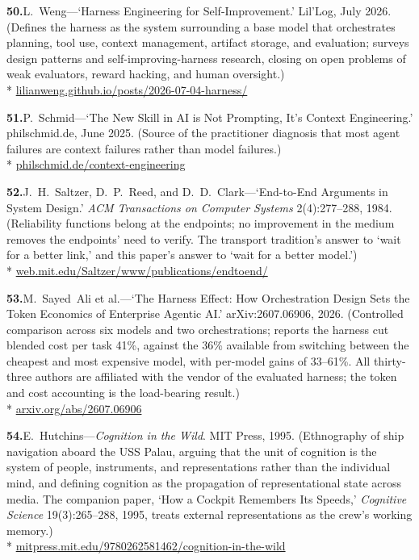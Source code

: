 \documentclass[11pt, a4paper]{article}
\begin{document}
\noindent\textbf{50.}\enspace L.~Weng---`Harness Engineering for Self-Improvement.'
Lil'Log, July 2026. (Defines the harness as the system surrounding a base model that
orchestrates planning, tool use, context management, artifact storage, and evaluation;
surveys design patterns and self-improving-harness research, closing on open problems of
weak evaluators, reward hacking, and human oversight.)\\*
{\fontsize{8}{10}\selectfont\color{midb}
\href{https://lilianweng.github.io/posts/2026-07-04-harness/}{lilianweng.github.io/posts/2026-07-04-harness/}}


\noindent\textbf{51.}\enspace P.~Schmid---`The New Skill in AI is Not Prompting, It's
Context Engineering.' philschmid.de, June 2025. (Source of the practitioner diagnosis that
most agent failures are context failures rather than model failures.)\\*
{\fontsize{8}{10}\selectfont\color{midb}
\href{https://www.philschmid.de/context-engineering}{philschmid.de/context-engineering}}


\noindent\textbf{52.}\enspace J.~H.~Saltzer, D.~P.~Reed, and D.~D.~Clark---`End-to-End
Arguments in System Design.' \textit{ACM Transactions on Computer Systems} 2(4):277--288,
1984. (Reliability functions belong at the endpoints; no improvement in the medium removes
the endpoints' need to verify. The transport tradition's answer to `wait for a better
link,' and this paper's answer to `wait for a better model.')\\*
{\fontsize{8}{10}\selectfont\color{midb}
\href{https://web.mit.edu/Saltzer/www/publications/endtoend/endtoend.pdf}{web.mit.edu/Saltzer/www/publications/endtoend/}}


\noindent\textbf{53.}\enspace M.~Sayed~Ali et al.---`The Harness Effect: How Orchestration
Design Sets the Token Economics of Enterprise Agentic AI.' arXiv:2607.06906, 2026.
(Controlled comparison across six models and two orchestrations; reports the harness cut
blended cost per task 41\%, against the 36\% available from switching between the
cheapest and most expensive model, with per-model gains of 33--61\%. All thirty-three
authors are affiliated with the vendor of the evaluated harness; the token and cost
accounting is the load-bearing result.)\\*
{\fontsize{8}{10}\selectfont\color{midb}
\href{https://arxiv.org/abs/2607.06906}{arxiv.org/abs/2607.06906}}


\noindent\textbf{54.}\enspace E.~Hutchins---\textit{Cognition in the Wild}. MIT Press,
1995. (Ethnography of ship navigation aboard the USS Palau, arguing that the unit of
cognition is the system of people, instruments, and representations rather than the
individual mind, and defining cognition as the propagation of representational state
across media. The companion paper, `How a Cockpit Remembers Its Speeds,'
\textit{Cognitive Science} 19(3):265--288, 1995, treats external representations as the
crew's working memory.)\\*
{\fontsize{8}{10}\selectfont\color{midb}
\href{https://mitpress.mit.edu/9780262581462/cognition-in-the-wild/}{mitpress.mit.edu/9780262581462/cognition-in-the-wild}}
\end{document}
